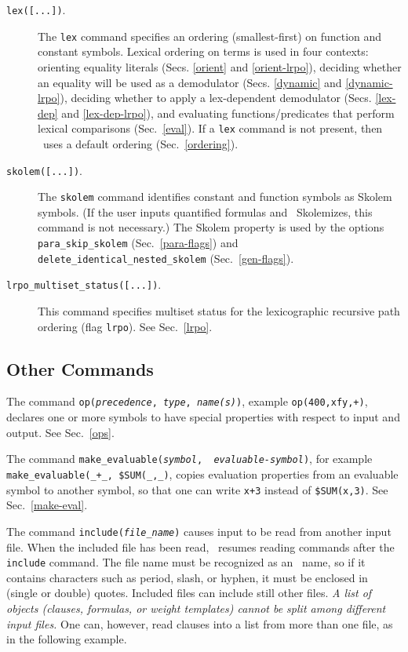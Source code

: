 \documentclass[11pt]{article}
\begin{document}
\begin{description}

\item[{\tt lex([...])}.]
The \verb:lex: command specifies an ordering (smallest-first) on
function and constant symbols.  Lexical ordering on terms is used in
four contexts: orienting equality literals (Secs. \ref{orient} and
\ref{orient-lrpo}), deciding whether an equality will be used
as a demodulator (Secs. \ref{dynamic} and \ref{dynamic-lrpo}),
deciding whether to apply a lex-dependent
demodulator (Secs. \ref{lex-dep} and \ref{lex-dep-lrpo}), and
evaluating functions/predicates that perform lexical comparisons
(Sec.~\ref{eval}).  If a \verb:lex: command is not present, then
\otter\ uses a default ordering (Sec.~\ref{ordering}).

\item[{\tt skolem([...])}.]
The \verb:skolem: command identifies constant and function symbols as
Skolem symbols.  (If the user inputs quantified formulas and
\otter\ Skolemizes, this command is not necessary.)  The Skolem
property is used by the options \verb:para_skip_skolem:
(Sec.~\ref{para-flags}) and \verb:delete_identical_nested_skolem:
(Sec.~\ref{gen-flags}).

\item[{\tt lrpo\_multiset\_status([...])}.]
This command specifies multiset status for the lexicographic recursive
path ordering (flag \verb:lrpo:).  See Sec.~\ref{lrpo}.
\end{description}

\subsection{Other Commands}

The command {\tt op({\it precedence}, {\it type}, {\it name(s)})},
example \verb:op(400,xfy,+):, declares one or more symbols to have
special properties with respect to input and output.  See
Sec.~\ref{ops}.

\begin{sloppypar}
The command {\tt make\_evaluable({\it symbol}, {\it
evaluable-symbol})}, for example \verb:make_evaluable(_+_, $SUM(_,_):,
copies evaluation properties from an evaluable symbol to another
symbol, so that one can write \verb:x+3: instead of \verb:$SUM(x,3):.
See Sec.~\ref{make-eval}.
\end{sloppypar}

The command {\tt include({\it file\_name})} causes input to be
read from another input file.  When the included file has been
read, \otter\ resumes reading commands after the \verb:include:
command.
The file name must be recognized as an \otter\ name, so if it
contains characters such as period, slash, or hyphen, it must
be enclosed in (single or double) quotes.
Included files can include still other files.
{\em A list of objects (clauses, formulas, or weight templates)
cannot be split among different input files.}  One can, however,
read clauses into a list from more than one file, as in the
following example.
\end{document}
